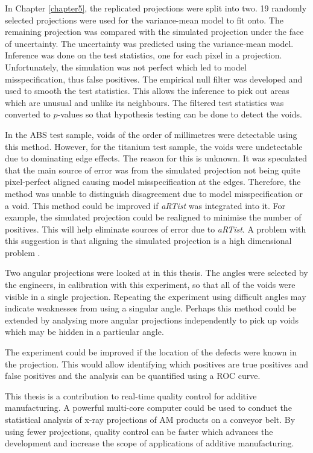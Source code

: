 \documentclass[12pt, a4paper]{memoir}
\begin{document}
In Chapter \ref{chapter5}, the replicated projections were split into two. 19 randomly selected projections were used for the variance-mean model to fit onto. The remaining projection was compared with the simulated projection under the face of uncertainty. The uncertainty was predicted using the variance-mean model. Inference was done on the test statistics, one for each pixel in a projection. Unfortunately, the simulation was not perfect which led to model misspecification, thus false positives. The empirical null filter was developed and used to smooth the test statistics. This allows the inference to pick out areas which are unusual and unlike its neighbours. The filtered test statistics was converted to $p$-values so that hypothesis testing can be done to detect the voids.

In the ABS test sample, voids of the order of millimetres were detectable using this method. However, for the titanium test sample, the voids were undetectable due to dominating edge effects. The reason for this is unknown. It was speculated that the main source of error was from the simulated projection not being quite pixel-perfect aligned causing model misspecification at the edges. Therefore, the method was unable to distinguish disagreement due to model misspecification or a void. This method could be improved if \emph{aRTist} was integrated into it. For example, the simulated projection could be realigned to minimise the number of positives. This will help eliminate sources of error due to \emph{aRTist}. A problem with this suggestion is that aligning the simulated projection is a high dimensional problem \citep{brierley2018optimized}.

Two angular projections were looked at in this thesis. The angles were selected by the engineers, in calibration with this experiment, so that all of the voids were visible in a single projection. Repeating the experiment using difficult angles may indicate weaknesses from using a singular angle. Perhaps this method could be extended by analysing more angular projections independently to pick up voids which may be hidden in a particular angle.

The experiment could be improved if the location of the defects were known in the projection. This would allow identifying which positives are true positives and false positives and the analysis can be quantified using a ROC curve.

This thesis is a contribution to real-time quality control for additive manufacturing. A powerful multi-core computer could be used to conduct the statistical analysis of x-ray projections of AM products on a conveyor belt. By using fewer projections, quality control can be faster which advances the development and increase the scope of applications of additive manufacturing.




\begin{appendices}

\end{appendices}
\end{document}
